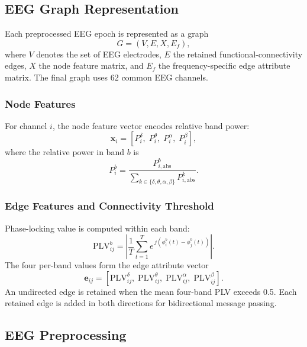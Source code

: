 \documentclass{ieeeaccess}
\begin{document}
\subsection{EEG Graph Representation}

Each preprocessed EEG epoch is represented as a graph
\begin{equation}
  G = (V, E, X, E_f),
\end{equation}
where $V$ denotes the set of EEG electrodes, $E$ the retained
functional-connectivity edges, $X$ the node feature matrix, and $E_f$ the
frequency-specific edge attribute matrix. The final graph uses 62 common EEG
channels.

\subsubsection{Node Features}
For channel $i$, the node feature vector encodes relative band power:
\begin{equation}
  \mathbf{x}_i =
  [P_i^{\delta},\; P_i^{\theta},\; P_i^{\alpha},\; P_i^{\beta}],
\end{equation}
where the relative power in band $b$ is
\begin{equation}
  P_i^b =
  \frac{P_{i,\mathrm{abs}}^b}
       {\displaystyle\sum_{k\in\{\delta,\theta,\alpha,\beta\}}
        P_{i,\mathrm{abs}}^k}.
\end{equation}

\subsubsection{Edge Features and Connectivity Threshold}
Phase-locking value is computed within each band:
\begin{equation}
  \mathrm{PLV}_{ij}^{b}
  = \left|\frac{1}{T}\sum_{t=1}^{T}
    e^{\,j(\phi_i^b(t)-\phi_j^b(t))}\right|.
\end{equation}
The four per-band values form the edge attribute vector
\begin{equation}
  \mathbf{e}_{ij}
  = [\mathrm{PLV}_{ij}^{\delta},\;
     \mathrm{PLV}_{ij}^{\theta},\;
     \mathrm{PLV}_{ij}^{\alpha},\;
     \mathrm{PLV}_{ij}^{\beta}].
\end{equation}
An undirected edge is retained when the mean four-band PLV exceeds 0.5.
Each retained edge is added in both directions for bidirectional message
passing.

\subsection{EEG Preprocessing}
\end{document}
